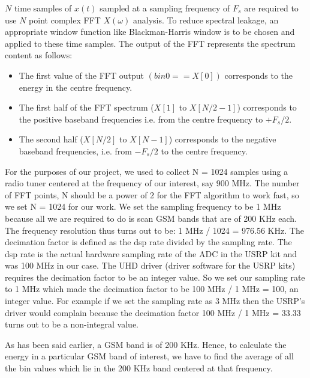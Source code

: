 $N$ time samples of $x(t)$ sampled at a sampling frequency of $F_{s}$ are 
required to use $N$ point complex FFT $X(\omega)$ analysis. To reduce spectral
leakage, an appropriate window function like Blackman-Harris window is to be 
chosen  and applied to these time samples. The output of the FFT represents 
the spectrum content as follows:

\begin{itemize}
    \item The first value of the FFT output $(bin0 == X[0])$ corresponds to 
    the energy in the centre frequency.
    \item The first half of the FFT spectrum ($X[1]$ to $X[N/2-1]$) 
    corresponds to the positive baseband frequencies i.e. from the centre 
    frequency to $+F_{s}/2$.
    \item The second half ($X[N/2]$ to $X[N-1]$) corresponds to the negative 
    baseband frequencies, i.e. from $-F_{s}/2$ to the centre frequency.
\end{itemize}


For the purposes of our project, we used to collect N = 1024 samples using a 
radio tuner centered at the frequency of our interest, say 900 MHz. The number
of FFT points, N should be a power of 2 for the FFT algorithm to work fast, so
we set N = 1024 for our work. We set the sampling frequency to be 1 MHz 
because all we are required to do is scan GSM bands that are of 200 KHz each. 
The frequency resolution thus turns out to be: 1 MHz / 1024 = 976.56 KHz. The 
decimation factor is defined as the dsp rate divided by the sampling rate. The
dsp rate is the actual hardware sampling rate of the ADC in the USRP kit and 
was 100 MHz in our case. The UHD driver (driver software for the USRP kits)
requires the decimation factor to be an integer value. So we set our sampling 
rate to 1 MHz which made the decimation factor to be 100 MHz / 1 MHz = 100, an
integer value. For example if we set the sampling rate as 3 MHz then the 
USRP's driver would complain because the decimation factor 100 MHz / 1 MHz = 
33.33 turns out to be a non-integral value.

As has been said earlier, a GSM band is of 200 KHz. Hence, to calculate the 
energy in a particular GSM band of interest, we have to find the average of 
all the bin values which lie in the 200 KHz band centered at that frequency.


